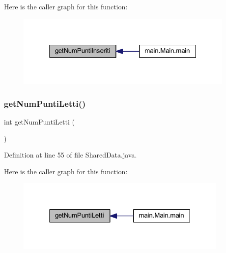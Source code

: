 Here is the caller graph for this function\+:
\nopagebreak
\begin{figure}[H]
\begin{center}
\leavevmode
\includegraphics[width=303pt]{classmain_1_1_shared_data_a605b5ca567b3e27a318d25b422eaf0a8_icgraph}
\end{center}
\end{figure}
\mbox{\label{classmain_1_1_shared_data_ada99c4b55a94591cbe74273d43d7171e}} 
\subsubsection{\texorpdfstring{get\+Num\+Punti\+Letti()}{getNumPuntiLetti()}}
{\footnotesize\ttfamily int get\+Num\+Punti\+Letti (\begin{DoxyParamCaption}{ }\end{DoxyParamCaption})}



Definition at line 55 of file Shared\+Data.\+java.

Here is the caller graph for this function\+:
\nopagebreak
\begin{figure}[H]
\begin{center}
\leavevmode
\includegraphics[width=294pt]{classmain_1_1_shared_data_ada99c4b55a94591cbe74273d43d7171e_icgraph}
\end{center}
\end{figure}
\mbox{\label{classmain_1_1_shared_data_adc76b1379d370fdffb139d532a622360}} 
